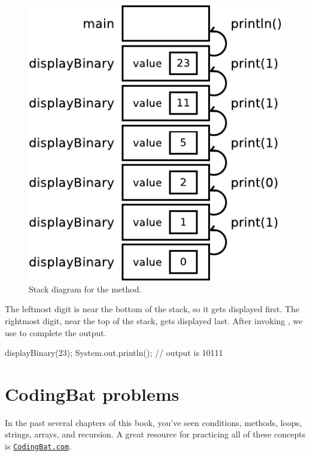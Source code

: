 
\begin{figure}[!ht]
\begin{center}
\includegraphics[scale=0.8]{figs/stack4.pdf}
\caption{Stack diagram for the  method.}
\label{fig.stack4}
\end{center}
\end{figure}

The leftmost digit is near the bottom of the stack, so it gets displayed first.
The rightmost digit, near the top of the stack, gets displayed last.
After invoking , we use  to complete the output.

\begin{code}
displayBinary(23);
System.out.println();
// output is 10111
\end{code}


\section{CodingBat problems}

In the past several chapters of this book, you've seen conditions, methods, loops, strings, arrays, and recursion.
A great resource for practicing all of these concepts is \href{http://codingbat.com/java}{\tt CodingBat.com}.


